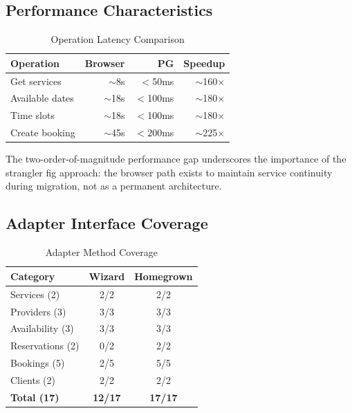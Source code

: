 \documentclass[conference]{IEEEtran}
\begin{document}
\subsection{Performance Characteristics}

\begin{table}[htbp]
\caption{Operation Latency Comparison}
\label{tab:perf}
\centering
\begin{tabular}{@{}lrrr@{}}
\toprule
\textbf{Operation} & \textbf{Browser} & \textbf{PG} & \textbf{Speedup} \\
\midrule
Get services & $\sim$8s & $<$50ms & $\sim$160$\times$ \\
Available dates & $\sim$18s & $<$100ms & $\sim$180$\times$ \\
Time slots & $\sim$18s & $<$100ms & $\sim$180$\times$ \\
Create booking & $\sim$45s & $<$200ms & $\sim$225$\times$ \\
\bottomrule
\end{tabular}
\end{table}

The two-order-of-magnitude performance gap underscores the importance of the strangler fig approach: the browser path exists to maintain service continuity during migration, not as a permanent architecture.

\subsection{Adapter Interface Coverage}

\begin{table}[htbp]
\caption{Adapter Method Coverage}
\label{tab:coverage}
\centering
\begin{tabular}{@{}lcc@{}}
\toprule
\textbf{Category} & \textbf{Wizard} & \textbf{Homegrown} \\
\midrule
Services (2) & 2/2 & 2/2 \\
Providers (3) & 3/3 & 3/3 \\
Availability (3) & 3/3 & 3/3 \\
Reservations (2) & 0/2 & 2/2 \\
Bookings (5) & 2/5 & 5/5 \\
Clients (2) & 2/2 & 2/2 \\
\midrule
\textbf{Total (17)} & \textbf{12/17} & \textbf{17/17} \\
\bottomrule
\end{tabular}
\end{table}
\end{document}
